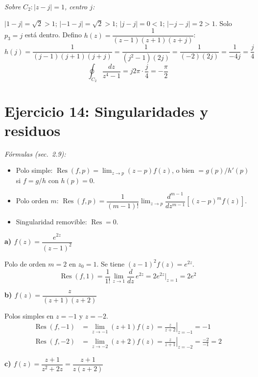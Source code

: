 \documentclass[10pt,a4paper]{article}
\begin{document}
\smallskip
\noindent\textit{Sobre $C_2: |z-j|=1$, centro $j$:}

$|1-j|=\sqrt{2}>1$;\; $|{-1-j}|=\sqrt{2}>1$;\; $|j-j|=0<1$\checkmark;\; $|{-j-j}|=2>1$.
Solo $p_3=j$ está dentro. Defino $h(z)=\dfrac{1}{(z-1)(z+1)(z+j)}$:
\[
	h(j) = \frac{1}{(j-1)(j+1)(j+j)} = \frac{1}{(j^2-1)(2j)} = \frac{1}{(-2)(2j)} = \frac{1}{-4j} = \frac{j}{4}
\]
\[
	\boxed{\oint_{C_2} \frac{dz}{z^4-1} = j2\pi\cdot\frac{j}{4} = -\frac{\pi}{2}}
\]

\section*{Ejercicio 14: Singularidades y residuos}

\noindent\textit{Fórmulas (sec.~2.9):}
\begin{itemize}[nosep]
	\item Polo simple: $\operatorname{Res}(f,p) = \lim_{z\to p}(z-p)f(z)$, o bien $= g(p)/h'(p)$ si $f=g/h$ con $h(p)=0$.
	\item Polo orden $m$: $\operatorname{Res}(f,p) = \dfrac{1}{(m-1)!}\lim_{z\to p}\dfrac{d^{m-1}}{dz^{m-1}}\!\left[(z-p)^m f(z)\right]$.
	\item Singularidad removible: $\operatorname{Res}=0$.
\end{itemize}

\bigskip

\noindent\textbf{a) $f(z) = \dfrac{e^{2z}}{(z-1)^2}$}

Polo de orden $m=2$ en $z_0=1$. Se tiene $(z-1)^2 f(z)=e^{2z}$.
\[
	\operatorname{Res}(f,1) = \frac{1}{1!}\lim_{z\to1}\frac{d}{dz}\,e^{2z}
	= 2e^{2z}\big|_{z=1} = \boxed{2e^2}
\]

\bigskip

\noindent\textbf{b) $f(z) = \dfrac{z}{(z+1)(z+2)}$}

Polos simples en $z=-1$ y $z=-2$.
\begin{align*}
	\operatorname{Res}(f,-1) &= \lim_{z\to-1}(z+1)f(z) = \left.\frac{z}{z+2}\right|_{z=-1} = \boxed{-1} \\[4pt]
	\operatorname{Res}(f,-2) &= \lim_{z\to-2}(z+2)f(z) = \left.\frac{z}{z+1}\right|_{z=-2} = \frac{-2}{-1} = \boxed{2}
\end{align*}

\bigskip

\noindent\textbf{c) $f(z) = \dfrac{z+1}{z^2+2z} = \dfrac{z+1}{z(z+2)}$}
\end{document}
